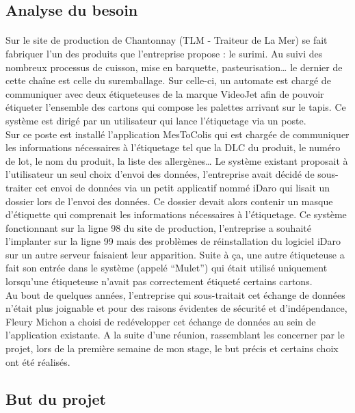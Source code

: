 \documentclass[a4paper,12pt]{extarticle}
\begin{document}
	\subsection{Analyse du besoin}
		\paragraph{}


	Sur le site de production de Chantonnay (TLM - Traiteur de La Mer) se fait fabriquer l’un des produits que l’entreprise propose : le surimi.
Au suivi des nombreux processus de cuisson, mise en barquette, pasteurisation… le dernier de cette chaîne est celle du suremballage. Sur celle-ci, un automate est chargé de communiquer avec deux étiqueteuses de la marque VideoJet afin de pouvoir étiqueter l’ensemble des cartons qui compose les palettes arrivant sur le tapis. Ce système est dirigé par un utilisateur qui lance l’étiquetage via un poste.\\
Sur ce poste est installé l’application MesToColis qui est chargée de communiquer les informations nécessaires à l’étiquetage tel que la DLC du produit, le numéro de lot, le nom du produit, la liste des allergènes… Le système existant proposait à l’utilisateur un seul choix d’envoi des données, l’entreprise avait décidé de sous-traiter cet envoi de données via un petit applicatif nommé iDaro qui lisait un dossier lors de l’envoi des données. Ce dossier devait alors contenir un masque d’étiquette qui comprenait les informations nécessaires à l’étiquetage. Ce système fonctionnant sur la ligne 98 du site de production, l’entreprise a souhaité l’implanter sur la ligne 99 mais des problèmes de réinstallation du logiciel iDaro sur un autre serveur faisaient leur apparition. Suite à ça, une autre étiqueteuse a fait son entrée dans le système (appelé “Mulet”) qui était utilisé uniquement lorsqu’une étiqueteuse n’avait pas correctement étiqueté certains cartons.\\
Au bout de quelques années, l’entreprise qui sous-traitait cet échange de données n’était plus joignable et pour des raisons évidentes de sécurité et d’indépendance, Fleury Michon a choisi de redévelopper cet échange de données au sein de l’application existante. A la suite d’une réunion, rassemblant les concerner par le projet, lors de la première semaine de mon stage, le but précis et certains choix ont été réalisés.\\

	\clearpage

	\subsection{But du projet}
\end{document}

